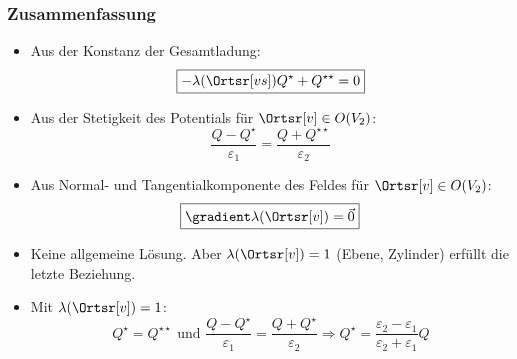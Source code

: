  \begin{frame}
     \frametitle{Zusammenfassung}
     \begin{itemize}[<+->]
     \item Aus der Konstanz der Gesamtladung:
       \begin{equation*}
          \boxed{-\lambda(\Ortsr[vs])Q^\star+Q^{\star\star}= 0}
       \end{equation*}
      \item Aus der Stetigkeit des Potentials für $\Ortsr[v]\in O(V_2)$:
        \begin{equation*}
          \boxed{\frac{Q-Q^\star}{\varepsilon_1} = \frac{Q+Q^{\star\star}}{\varepsilon_2}}
       \end{equation*}
     \item Aus Normal- und Tangentialkomponente des Feldes für $\Ortsr[v]\in O(V_2)$:
       \begin{equation*}
         \boxed{\gradient \lambda(\Ortsr[v]) = \vec{0}}
       \end{equation*}
     \item Keine allgemeine Lösung. Aber $\lambda (\Ortsr[v]) = 1$ (Ebene, Zylinder) erfüllt die letzte Beziehung.
     \item Mit $\lambda (\Ortsr[v]) = 1$:
       \begin{equation*}
         Q^\star = Q^{\star\star} \text{ und } \frac{Q-Q^\star}{\varepsilon_1} = \frac{Q+Q^{\star}}{\varepsilon_2} \Rightarrow \boxed{Q^\star = \frac{\varepsilon_2-\varepsilon_1}{\varepsilon_2+\varepsilon_1} Q}
         \end{equation*}
         
       \end{itemize}
 \end{frame}

